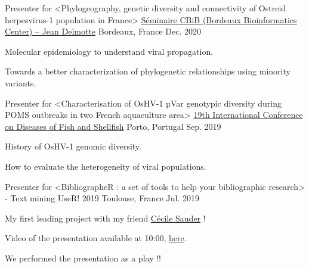 

\begin{cventries}

  \cventry
    {Presenter for <Phylogeography, genetic diversity and connectivity of Ostreid herpesvirus-1 population in France>} %
    {\href{https://www.bordeaux-neurocampus.fr/en/event/seminaire-cbib-jean-delmotte/}{Séminaire CBiB (Bordeaux Bioinformatics Center) – Jean Delmotte}} %
    {Bordeaux, France} %
    {Dec. 2020} %
    {
      \begin{cvitems} %
        \item {Molecular epidemiology to understand viral propagation.}
        \item {Towards a better characterization of phylogenetic relationships using minority variants.}
      \end{cvitems}
    }

  \cventry
    {Presenter for <Characterisation of OsHV-1 µVar genotypic diversity during POMS outbreaks in two French aquaculture area>} %
    {\href{https://eafp.org/19-eafp-porto-2019/}{19th International Conference on Diseases of Fish and Shellfish}} %
    {Porto, Portugal} %
    {Sep. 2019} %
    {
      \begin{cvitems} %
        \item {History of OsHV-1 genomic diversity.}
        \item {How to evaluate the heterogeneity of viral populations.}
      \end{cvitems}
    }

  \cventry
    {Presenter for <BibliographeR : a set of tools to help your bibliographic research>  - Text mining} %
    {UseR! 2019} %
    {Toulouse, France} %
    {Jul. 2019} %
    {
      \begin{cvitems} %
        \item {My first leading project with my friend \href{https://twitter.com/cecilesauder}{Cécile Sauder} !}
        \item {Video of the presentation available at 10:00, \href{https://www.youtube.com/watch?v=6V_nu0K_3mk&list=PL4IzsxWztPdm9_UFnWOCG7Rmw3oW5Fgju}{here}.}
        \item {We performed the presentation as a play !!}
        \\
      \end{cvitems}
    }

\end{cventries}

